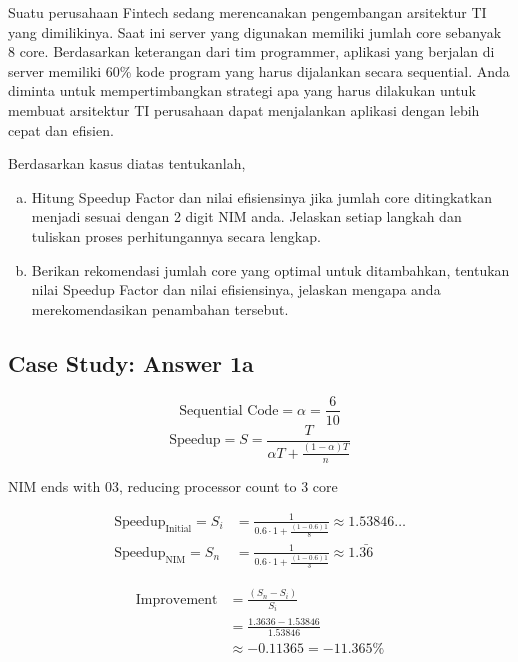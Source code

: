 \documentclass[
	11pt, %
	indonesian
]{assignment}
\begin{document}
\begin{problem}
Suatu perusahaan Fintech sedang merencanakan pengembangan arsitektur TI yang dimilikinya.
Saat ini server yang digunakan memiliki jumlah core sebanyak 8 core. Berdasarkan keterangan
dari tim programmer, aplikasi yang berjalan di server memiliki 60\% kode program yang harus
dijalankan secara sequential. Anda diminta untuk mempertimbangkan strategi apa yang harus
dilakukan untuk membuat arsitektur TI perusahaan dapat menjalankan aplikasi dengan lebih
cepat dan efisien.

\medskip

Berdasarkan kasus diatas tentukanlah,

\medskip

\begin{enumerate}[a.]
	\item Hitung Speedup Factor dan nilai efisiensinya jika jumlah core ditingkatkan menjadi sesuai dengan 2 digit NIM anda. Jelaskan setiap langkah dan tuliskan proses perhitungannya secara lengkap.
	\item Berikan rekomendasi jumlah core yang optimal untuk ditambahkan, tentukan nilai Speedup Factor dan nilai efisiensinya, jelaskan mengapa anda merekomendasikan penambahan tersebut.
\end{enumerate}
\end{problem}

\subsection*{Case Study: Answer 1a}

\[ \text{Sequential Code} = \alpha = \frac{6}{10} \]
\[ \text{Speedup} = S = \frac{T}{\alpha T + \frac{(1 - \alpha) T}{n}} \]

NIM ends with 03, reducing processor count to 3 core

\[
	\begin{aligned}
		\text{Speedup}_\text{Initial} = S_i & = \frac{1}{0.6 \cdot 1 + \frac{(1 - 0.6) 1}{8}} \approx 1.53846\dots \\
		\text{Speedup}_\text{NIM}     = S_n & = \frac{1}{0.6 \cdot 1 + \frac{(1 - 0.6) 1}{3}} \approx 1.\bar{36}
	\end{aligned}
\]

\[
	\begin{aligned}
		\text{Improvement} & = \frac{(S_n - S_i)}{S_i}          \\
		                   & = \frac{1.3636 - 1.53846}{1.53846} \\
		                   & \approx -0.11365 = -11.365\%       \\
	\end{aligned}
\]
\end{document}
